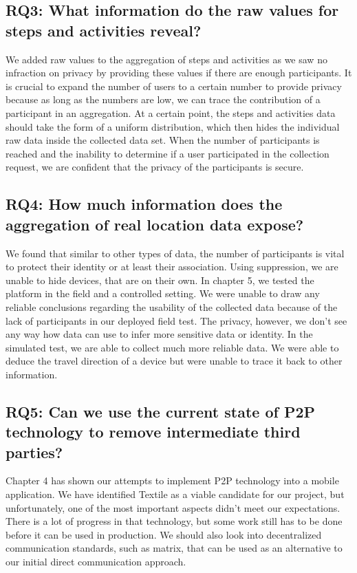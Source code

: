 \subsection*{RQ3: What information do the raw values for steps and activities reveal?}
We added raw values to the aggregation of steps and activities as we saw no infraction on privacy by providing these values if there are enough participants. It is crucial to expand the number of users to a certain number to provide privacy because as long as the numbers are low, we can trace the contribution of a participant in an aggregation. At a certain point, the steps and activities data should take the form of a uniform distribution, which then hides the individual raw data inside the collected data set. When the number of participants is reached and the inability to determine if a user participated in the collection request, we are confident that the privacy of the participants is secure. 

\subsection*{RQ4: How much information does the aggregation of real location data expose?}
We found that similar to other types of data, the number of participants is vital to protect their identity or at least their association. Using suppression, we are unable to hide devices, that are on their own. In chapter 5, we tested the platform in the field and a controlled setting. We were unable to draw any reliable conclusions regarding the usability of the collected data because of the lack of participants in our deployed field test. The privacy, however, we don't see any way how data can use to infer more sensitive data or identity. In the simulated test, we are able to collect much more reliable data. We were able to deduce the travel direction of a device but were unable to trace it back to other information.

\subsection*{RQ5: Can we use the current state of P2P technology to remove intermediate third parties?}
Chapter 4 has shown our attempts to implement P2P technology into a mobile application. We have identified Textile as a viable candidate for our project, but unfortunately, one of the most important aspects didn't meet our expectations. There is a lot of progress in that technology, but some work still has to be done before it can be used in production. We should also look into decentralized communication standards, such as matrix, that can be used as an alternative to our initial direct communication approach.

